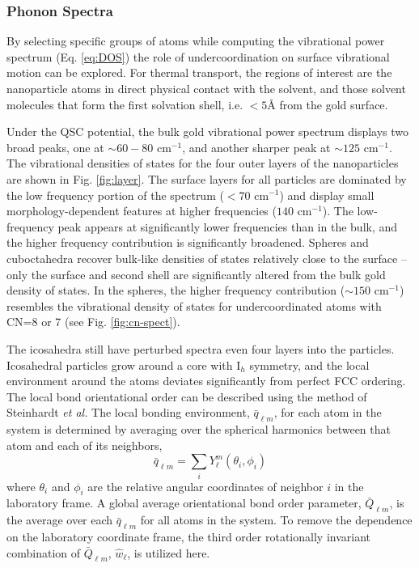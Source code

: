 \subsubsection{Phonon Spectra}
By selecting specific groups of atoms while computing the vibrational
power spectrum (Eq. \ref{eq:DOS}) the role of
undercoordination on surface vibrational motion can be explored. For thermal
transport, the regions of interest are the nanoparticle atoms in
direct physical contact with the solvent, and those solvent molecules
that form the first solvation shell, i.e. $< 5 \text{\AA}$ from the
gold surface.

Under the QSC potential, the bulk gold vibrational power spectrum
displays two broad peaks, one at $\sim 60-80 \text{~cm}^{-1}$, and
another sharper peak at $\sim 125 \text{~cm}^{-1}$.  The vibrational
densities of states for the four outer layers of the nanoparticles are
shown in Fig. \ref{fig:layer}.  The surface layers for all particles
are dominated by the low frequency portion of the spectrum
($<70 \text{~cm}^{-1}$) and display small morphology-dependent
features at higher frequencies ($140 \text{~cm}^{-1}$). The
low-frequency peak appears at significantly lower frequencies than in
the bulk, and the higher frequency contribution is significantly
broadened.  Spheres and cuboctahedra recover bulk-like densities of
states relatively close to the surface -- only the surface and second
shell are significantly altered from the bulk gold density of
states. In the spheres, the higher frequency contribution
($\sim 150 \text{~cm}^{-1}$) resembles the vibrational density of
states for undercoordinated atoms with CN=8 or 7 (see 
Fig. \ref{fig:cn-spect}).

The icosahedra still have perturbed spectra even four layers into the
particles. Icosahedral particles grow around a core with
$\mathrm{I}_h$ symmetry, and the local environment around the atoms
deviates significantly from perfect FCC ordering.  The local bond
orientational order can be described using the method of Steinhardt
\textit{et al.}\cite{Steinhardt1983} 
The local bonding environment,
$\bar{q}_{\ell m}$, for each atom in the system is determined by
averaging over the spherical harmonics between that atom and each of
its neighbors,
\begin{equation}
\bar{q}_{\ell m} = \sum_i Y_\ell^m(\theta_i, \phi_i)
\end{equation}
where $\theta_i$ and $\phi_i$ are the relative angular coordinates of
neighbor $i$ in the laboratory frame.  A global average orientational
bond order parameter, $\bar{Q}_{\ell m}$, is the average over each
$\bar{q}_{\ell m}$ for all atoms in the system. To remove the
dependence on the laboratory coordinate frame, the third order
rotationally invariant combination of $\bar{Q}_{\ell m}$,
$\hat{w}_\ell$, is utilized here.\cite{Steinhardt1983,Vardeman:2008fk}

